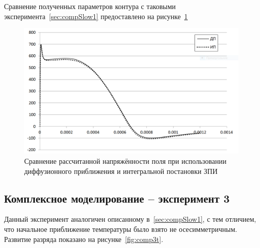 Сравнение полученных параметров контура с таковыми 
эксперимента~\ref{sec:compSlow1} предоставлено на рисунке~\ref{fig:EComplexvsC1}

\begin{figure}[h]
    \centering
    \includegraphics[width=.5\linewidth]{img/experiments/complexInt/EvsDiff}
    \caption{Сравнение рассчитанной напряжённости поля  при использовании 
    диффузионного приближения и интегральной постановки ЗПИ}
    \label{fig:EComplexvsC1}
\end{figure}

\subsection{Комплексное моделирование -- эксперимент 3}
Данный эксперимент аналогичен описанному в~\ref{sec:compSlow1}, с тем отличием, 
что начальное приближение температуры было взято не осесимметричным. Развитие 
разряда показано на рисунке~\ref{fig:comp3t}.

